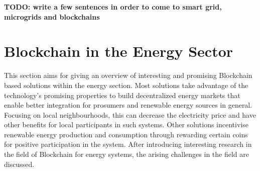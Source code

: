 \documentclass[runningheads]{llncs}
\begin{document}
\textbf{TODO: write a few sentences in order to come to smart grid, microgrids and blockchains}


\section{Blockchain in the Energy Sector}
This section aims for giving an overview of interesting and promising Blockchain based solutions within the energy section. Most solutions take advantage of the technology's promising properties to build decentralized energy markets that enable better integration for prosumers and renewable energy sources in general. Focusing on local neighbourhoods, this can decrease the electricity price and have other benefits for local participants in such systems. Other solutions incentivise renewable energy production and consumption through rewarding certain coins for positive participation in the system. After introducing interesting research in the field of Blockchain for energy systems, the arising challenges in the field are discussed.
\end{document}
